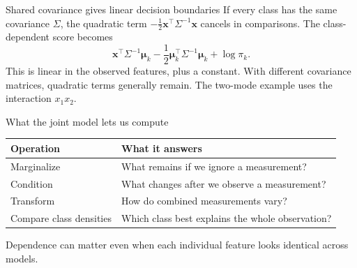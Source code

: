 \documentclass[aspectratio=169,12pt]{beamer}
\begin{document}
\begin{frame}{Shared covariance gives linear decision boundaries}
If every class has the same covariance $\Sigma$, the quadratic term
$-\tfrac12\mathbf x^\top\Sigma^{-1}\mathbf x$ cancels in comparisons.
\vfill
The class-dependent score becomes
\[
  \mathbf x^\top\Sigma^{-1}\boldsymbol\mu_k
  -\frac12\boldsymbol\mu_k^\top\Sigma^{-1}\boldsymbol\mu_k
  +\log\pi_k.
\]
This is linear in the observed features, plus a constant.
\vfill
With different covariance matrices, quadratic terms generally remain.
The two-mode example uses the interaction $x_1x_2$.
\end{frame}

\begin{frame}{What the joint model lets us compute}
\renewcommand{\arraystretch}{1.5}
\begin{tabular}{@{}ll@{}}
\toprule
\textbf{Operation} & \textbf{What it answers}\\
\midrule
Marginalize & What remains if we ignore a measurement?\\
Condition & What changes after we observe a measurement?\\
Transform & How do combined measurements vary?\\
Compare class densities & Which class best explains the whole observation?\\
\bottomrule
\end{tabular}
\vfill
Dependence can matter even when each individual feature looks identical
across models.
\end{frame}
\end{document}
